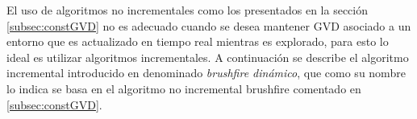 El uso de algoritmos no incrementales como los presentados en la sección \ref{subsec:constGVD} no es adecuado cuando se desea mantener GVD asociado a un entorno que es actualizado en tiempo real mientras es explorado, para esto lo ideal es utilizar algoritmos incrementales. A continuación se describe el algoritmo incremental introducido en \cite{kalra2009incremental} denominado \emph{brushfire dinámico}, que como su nombre lo indica se basa en el algoritmo no incremental brushfire comentado en \ref{subsec:constGVD}.



